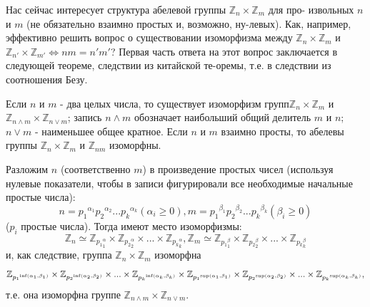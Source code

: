 \documentclass{mai_book}
\begin{document}
  Нас сейчас интересует структура абелевой группы $\mathbb{Z}_n \times \mathbb{Z}_m$ для про- \linebreak извольных $n$ и $m$ (не обязательно взаимно простых и, возможно, ну-\linebreak левых). Как, например, эффективно решить вопрос о существовании \linebreak изоморфизма между $\mathbb{Z}_n \times \mathbb{Z}_m$ и  $\mathbb{Z}_{n'} \times \mathbb{Z}_{m'} \Longleftrightarrow nm=n'm'$? Первая часть ответа на этот \linebreak вопрос заключается в следующей теореме, следствии из китайской те-\linebreak оремы, т.е. в следствии из соотношения Безу.
\begin{thm}

  Если $n$ и $m$ - два целых числа, то существует изоморфизм групп\linebreak $\mathbb{Z}_n \times \mathbb{Z}_m$ и $\mathbb{Z}_{n \wedge m} \times \mathbb{Z}_{n \vee m}$; запись  $n \wedge m$ обозначает наибольший общий \linebreak делитель $m$ и $n$; $n \vee m$ - наименьшее общее кратное. Если $n$ и $m$ взаимно \linebreak просты, то абелевы группы $\mathbb{Z}_n \times \mathbb{Z}_m$ и $\mathbb{Z}_{nm}$ изоморфны.
\end{thm}
\newpage
\begin{myproof}
Разложим $n$ (соответственно $m$) в произведение простых чисел \linebreak(используя нулевые показатели, чтобы в записи фигурировали все \linebreak необходимые начальные простые числа):
$$n={p_1}^{\alpha_1}{p_2}^{\alpha_2}...{p_k}^{\alpha_k} (\alpha_i \ge 0), m={p_1}^{\beta
_1}{p_2}^{\beta_2}...{p_k}^{\beta_k} (\beta_i \ge 0)$$
($p_i$ простые числа).
Тогда имеют место изоморфизмы:
$$\mathbb{Z}_n \simeq \mathbb{Z}_{{p_1}^\alpha_1} \times \mathbb{Z}_{{p_2}^\alpha_2} \times ... \times \mathbb{Z}_{{p_k}^\alpha_k}, \mathbb{Z}_m \simeq \mathbb{Z}_{{p_1}^\beta_1} \times \mathbb{Z}_{{p_2}^\beta_2} \times ... \times \mathbb{Z}_{{p_k}^\beta_k}$$
и, как следствие, группа $\mathbb{Z}_n \times \mathbb{Z}_m$ изоморфна
$$\mathbb{Z}_{{p_1}^{\inf(\alpha_1, \beta_1)}} \times \mathbb{Z}_{{p_2}^{\inf(\alpha_2, \beta_2)}} \times ... \times \mathbb{Z}_{{p_k}^{\inf(\alpha_k, \beta_k)}}\linebreak \times \mathbb{Z}_{{p_1}^{\sup(\alpha_1, \beta_1)}} \times \mathbb{Z}_{{p_2}^{\sup(\alpha_2, \beta_2)}} \times ... \times \mathbb{Z}_{{p_k}^{\sup(\alpha_k, \beta_k)}},$$
т.е. она изоморфна группе $\mathbb{Z}_{n \wedge m} \times \mathbb{Z}_{n \vee m}$.
\end{myproof}
\end{document}

